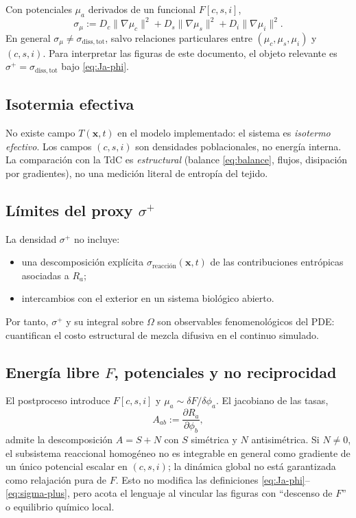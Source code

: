 \documentclass[11pt,a4paper]{article}
\newcommand{\vect}[1]{\mathbf{#1}}
\begin{document}
Con potenciales $\mu_a$ derivados de un funcional $F[c,s,i]$,
\begin{equation}
\label{eq:sigma-mu}
\sigma_\mu := D_c\lVert\nabla\mu_c\rVert^2 + D_s\lVert\nabla\mu_s\rVert^2 + D_i\lVert\nabla\mu_i\rVert^2 .
\end{equation}
En general $\sigma_\mu \neq \sigma_{\mathrm{diss,tot}}$, salvo relaciones
particulares entre $(\mu_c,\mu_s,\mu_i)$ y $(c,s,i)$. Para interpretar las
figuras de este documento, el objeto relevante es $\sigma^{+}=\sigma_{\mathrm{diss,tot}}$
bajo \eqref{eq:Ja-phi}.

\subsection{Isotermia efectiva}

No existe campo $T(\vect{x},t)$ en el modelo implementado: el sistema es
\emph{isotermo efectivo}. Los campos $(c,s,i)$ son densidades poblacionales, no
energía interna. La comparación con la TdC es \emph{estructural} (balance
\eqref{eq:balance}, flujos, disipación por gradientes), no una medición literal
de entropía del tejido.

\subsection{Límites del proxy $\sigma^{+}$}

La densidad $\sigma^{+}$ no incluye:
\begin{itemize}
  \item una descomposición explícita $\sigma_{\mathrm{reacción}}(\vect{x},t)$ de
  las contribuciones entrópicas asociadas a $R_a$;
  \item intercambios con el exterior en un sistema biológico abierto.
\end{itemize}
Por tanto, $\sigma^{+}$ y su integral sobre $\Omega$ son observables
fenomenológicos del PDE: cuantifican el costo estructural de mezcla difusiva en
el continuo simulado.

\subsection{Energía libre $F$, potenciales y no reciprocidad}

El postproceso introduce $F[c,s,i]$ y $\mu_a\sim \delta F/\delta\phi_a$. El
jacobiano de las tasas,
\begin{equation}
\label{eq:jacobian-R}
A_{ab} := \frac{\partial R_a}{\partial \phi_b},
\end{equation}
admite la descomposición $A=S+N$ con $S$ simétrica y $N$ antisimétrica. Si
$N\neq 0$, el subsistema reaccional homogéneo no es integrable en general como
gradiente de un único potencial escalar en $(c,s,i)$; la dinámica global no está
garantizada como relajación pura de $F$. Esto no modifica las definiciones
\eqref{eq:Ja-phi}--\eqref{eq:sigma-plus}, pero acota el lenguaje al vincular
las figuras con ``descenso de $F$'' o equilibrio químico local.
\end{document}
